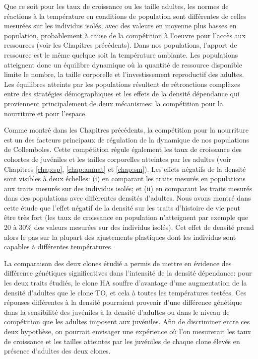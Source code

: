 Que ce soit pour les taux de croissance ou les taille adultes, les normes de
réactions à la température en conditions de population sont différentes de
celles mesurées sur les individus isolés, avec des valeurs en moyenne plus
basses en population, probablement à cause de la compétition à l'oeuvre pour
l'accès aux ressources (voir les Chapitres précédents). Dans nos populations,
l'apport de ressource est le même quelque soit la température ambiante. Les
populations atteignent donc un équilibre dynamique où la quantité de ressource
disponible limite le nombre, la taille corporelle et l'investissement
reproductif des adultes. Les équilibres atteints par les populations résultent
de rétroactions complèxes entre des stratégies démographiques
\autocites[dépendantes des clones,][]{tully2008a,stam1996a} et les effets de la
densité dépendance \autocites{kokko2007a} qui proviennent principalement de deux
mécanismes: la compétition pour la nourriture et pour l'espace. 

Comme montré dans les Chapitres précédents, la compétition pour la nourriture
est un des facteurs principaux de régulation de la dynamique de
nos populations de Collemboles. Cette compétition régule également les taux de
croissance des cohortes de juvéniles et les tailles corporelles atteintes par
les adultes (voir Chapitres \ref{chap:sp}, \ref{chap:amnat} et \ref{chap:sm}).
Les effets négatifs de la densité sont visibles à deux échelles: (i) en
comparant les traits mesurés en populations aux traits mesurés sur des individus
isolés; et (ii) en comparant les traits mesurés dans des populations avec
différentes densités d'adultes. Nous avons montré dans cette étude que l'effet
négatif de la densité sur les traits d'histoire de vie peut être très fort (les
taux de croissance en population n'atteignent par exemple que 20 à $30\%$ des
valeurs mesurées sur des individus isolés). Cet effet de densité prend alors le
pas sur la plupart des ajustements plastiques dont les individus sont capables à
différentes températures. 

La comparaison des deux clones étudié a permis de mettre en évidence des
différence génétiques significatives dans l'intensité de la densité dépendance:
pour les deux traits étudiés, le clone HA souffre d'avantage d'une augmentation
de la densité d'adultes que le clone TO, et cela à toutes les températures
testées. Ces réponses différentes à la densité pourraient provenir d'une
différence génétique dans la sensibilité des juvéniles à la densité d'adultes
ou dans le niveau de compétition que les adultes imposent aux juvéniles. Afin de
discriminer entre ces deux hypothèse, on pourrait envisager une expérience où
l'on mesurerait les taux de croissance et les tailles atteintes par les juvéniles
de chaque clone élevés en présence d'adultes des deux clones. 

